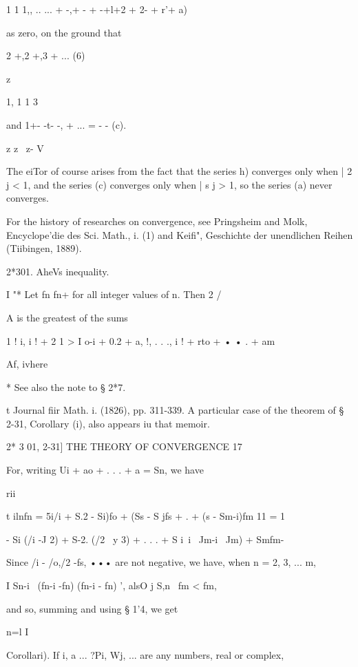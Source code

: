 1 1 1,, .. ... + -,+ - + -+l+2 + 2- + r'+ a)

as zero, on the ground that

2 +,2 +,3 + ... (6)

\-z

1, 1 1 3

and 1+- -t- -, + ... = - - (c).

z z~ z- V

The eiTor of course arises from the fact that the series h) converges
only when | 2 j < 1, and the series (c) converges only when | s j > 1,
so the series (a) never converges.

For the history of researches on convergence, see Pringsheim and Molk,
Encyclope'die des Sci. Math., i. (1) and Keifi", Geschichte der
unendlichen Reihen (Tiibingen, 1889).



2*301. AheVs inequality.

I "* Let fn fn+ for all integer values of n. Then 2 /

A is the greatest of the sums

1 ! i, i ! + 2 1 > I o-i + 0.2 + a, !, . . ., i ! + rto + • • . + am



  Af, ivhere



* See also the note to § 2*7.

t Journal fiir Math. i. (1826), pp. 311-339. A particular case of the
theorem of § 2-31, Corollary (i), also appears iu that memoir.



2* 3 01, 2-31] THE THEORY OF CONVERGENCE 17

For, writing Ui + ao + . . . + a = Sn, we have

rii

t ilnfn = 5i/i + S.2 - Si)fo + (Ss - S jfs + . + (s - Sm-i)fm 11 = 1

- Si (/i -J 2) + S-2. (/2 ~y 3) + . . . + S i\ i \ Jm-i ~Jm) + Smfm-

Since /i - /o,/2 -fs, ••• are not negative, we have, when n = 2, 3,
... m,

I Sn-i \ (fn-i -fn) (fn-i - fn) ', alsO j S,n \ fm < fm,

and so, summing and using § 1'4, we get

n=l I

Corollari). If i, a ... ?Pi, Wj, ... are any numbers, real or complex,



